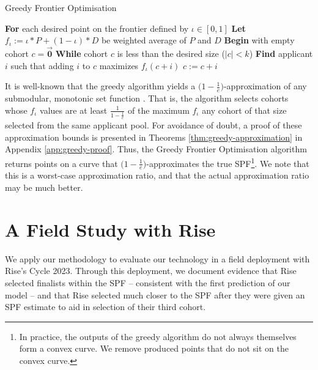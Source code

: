 \begin{algorithm}
    \caption{Greedy Frontier Optimisation}\label{alg:frontier}
    \begin{algorithmic}
    \State \textbf{For} each desired point on the frontier defined by $\iota \in [0, 1]$
    \State \hspace{\algorithmicindent} \textbf{Let} $f_{\iota} := \iota*P+(1-\iota)*D$ be weighted average of $P$ and $D$
    \State \hspace{\algorithmicindent} \textbf{Begin} with empty cohort $c = \vec{\mathbf{0}}$
    \State \hspace{\algorithmicindent} \textbf{While} cohort $c$ is less than the desired size ($|c| < k$)
    \State \hspace{\algorithmicindent} \hspace{\algorithmicindent} \textbf{Find} applicant $i$ such that adding $i$ to $c$ maximizes $f_{\iota}(c + i)$
    \State \hspace{\algorithmicindent} \hspace{\algorithmicindent} $c := c + i$
    \end{algorithmic}
\end{algorithm}

It is well-known that the greedy algorithm yields a $\bigl( 1-\frac{1}{e} \bigr)$-approximation of any submodular, monotonic set function \cite{bordeaux_submodular_2014}. That is, the algorithm selects cohorts whose $f_\iota$ values are at least $\frac{1}{1-\frac{1}{e}}$ of the maximum $f_\iota$ any cohort of that size selected from the same applicant pool. For avoidance of doubt, a proof of these approximation bounds is presented in Theorems \ref{thm:greedy-approximation} in Appendix \ref{app:greedy-proof}. Thus, the Greedy Frontier Optimisation algorithm returns points on a curve that $\bigl( 1-\frac{1}{e} \bigr)$-approximates the true SPF\footnote{In practice, the outputs of the greedy algorithm do not always themselves form a convex curve. We remove produced points that do not sit on the convex curve.}. We note that this is a worst-case approximation ratio, and that the actual approximation ratio may be much better.

\section{A Field Study with Rise}\label{sec:spfresults}

We apply our methodology to evaluate our technology in a field deployment with Rise's Cycle 2023. Through this deployment, we document evidence that Rise selected finalists within the SPF -- consistent with the first prediction of our model -- and that Rise selected much closer to the SPF after they were given an SPF estimate to aid in selection of their third cohort.

